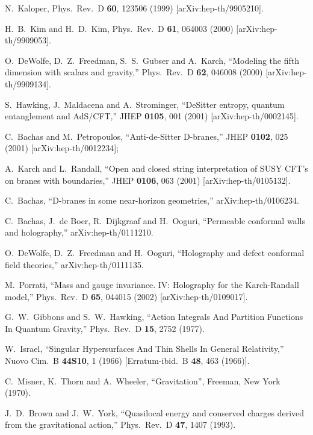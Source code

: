 \documentclass[a4paper,12pt,oneside]{article}
\begin{document}
\begin{thebibliography}{99}
N.~Kaloper,
Phys.\ Rev.\ D {\bf 60}, 123506 (1999)
[arXiv:hep-th/9905210].

H.~B.~Kim and H.~D.~Kim,
Phys.\ Rev.\ D {\bf 61}, 064003 (2000)
[arXiv:hep-th/9909053].


O.~DeWolfe, D.~Z.~Freedman, S.~S.~Gubser and A.~Karch,
``Modeling the fifth dimension with scalars and gravity,''
Phys.\ Rev.\ D {\bf 62}, 046008 (2000)
[arXiv:hep-th/9909134].


S.~Hawking, J.~Maldacena and A.~Strominger,
``DeSitter entropy, quantum entanglement and AdS/CFT,''
JHEP {\bf 0105}, 001 (2001)
[arXiv:hep-th/0002145].


C.~Bachas and M.~Petropoulos,
``Anti-de-Sitter D-branes,''
JHEP {\bf 0102}, 025 (2001)
[arXiv:hep-th/0012234]; 


A.~Karch and L.~Randall,
``Open and closed string interpretation
 of SUSY CFT's on branes with  boundaries,''
JHEP {\bf 0106}, 063 (2001)
[arXiv:hep-th/0105132].

 C.~Bachas,
``D-branes in some near-horizon geometries,''
arXiv:hep-th/0106234.


C.~Bachas, J.~de Boer, R.~Dijkgraaf and H.~Ooguri,
``Permeable conformal walls and holography,''
arXiv:hep-th/0111210.

O.~DeWolfe, D.~Z.~Freedman and H.~Ooguri,
``Holography and defect conformal field theories,''
arXiv:hep-th/0111135.

M.~Porrati,
``Mass and gauge invariance. IV: Holography for the Karch-Randall model,''
Phys.\ Rev.\ D {\bf 65}, 044015 (2002)
[arXiv:hep-th/0109017].


G.~W.~Gibbons and S.~W.~Hawking,
``Action Integrals And Partition Functions In Quantum Gravity,''
Phys.\ Rev.\ D {\bf 15}, 2752 (1977).

W.~Israel,
``Singular Hypersurfaces And Thin Shells In General Relativity,''
Nuovo Cim.\ B {\bf 44S10}, 1 (1966)
[Erratum-ibid.\ B {\bf 48}, 463 (1966)].


 C.~Misner, K.~Thorn and A.~Wheeler,
``Gravitation'', Freeman, New York (1970).

J.~D.~Brown and J.~W.~York,
``Quasilocal energy and conserved charges
 derived from the gravitational action,''
Phys.\ Rev.\ D {\bf 47}, 1407 (1993).


\end{thebibliography}
\end{document}
